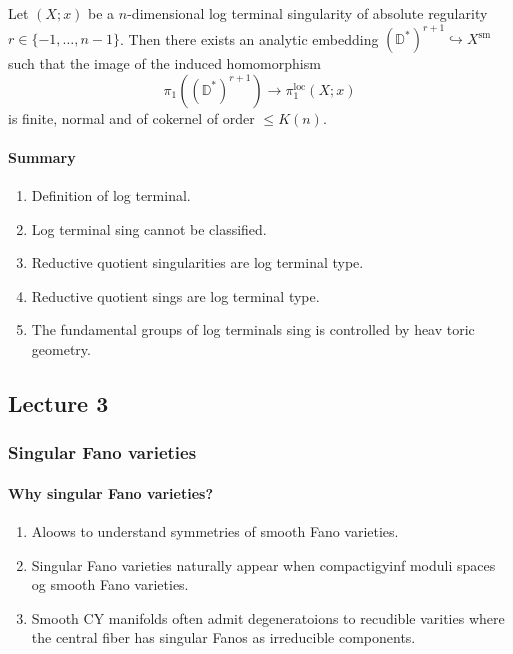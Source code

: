 \begin{thm}[M (speaker),21]\leavevmode
	Let $(X;x)$ be a $n$-dimensional log terminal singularity of absolute regularity $r\in \{-1,\ldots,n-1\} $. Then there exists an analytic embedding $(\mathbb{D}^{*} )^{r+1} \hookrightarrow X^{\operatorname{sm}}$ such that the image of the induced homomorphism
	\[\pi_{1}(\left(\mathbb{D}^{*}  \right)^{r+1})\to \pi_{1}^{\operatorname{loc}}(X;x) \]
	is finite, normal and of cokernel of order $\leq K(n)$.
\end{thm}

\paragraph{Summary} 
\begin{enumerate}
	\item Definition of log terminal.
	\item Log terminal sing cannot be classified.
	\item Reductive quotient singularities are log terminal type.
	\item Reductive quotient sings are log terminal type.
	\item  The fundamental groups of log terminals sing is controlled by {\color{blue}heav} toric geometry.
\end{enumerate}

\subsection{Lecture 3}

\subsubsection{Singular Fano varieties}

\paragraph{Why singular Fano varieties?}
\begin{enumerate}
	\item Aloows to understand symmetries of smooth Fano varieties.
	\item Singular Fano varieties naturally appear when compactigyinf moduli spaces og smooth Fano varieties.
	\item Smooth CY manifolds often admit degeneratoions to recudible varities where the central fiber has singular Fanos as irreducible components.
\end{enumerate}


